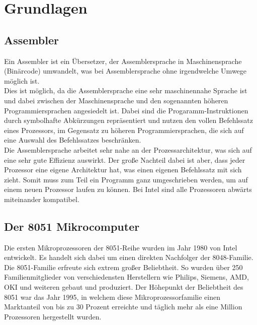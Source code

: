 \chapter{Grundlagen}

\section{Assembler}

Ein Assembler ist ein Übersetzer, der Assemblersprache in Maschinensprache (Binärcode) umwandelt, was bei Assemblersprache
ohne irgendwelche Umwege möglich ist.\\
Dies ist möglich, da die Assemblersprache eine sehr maschinennahe Sprache ist und dabei zwischen der Maschinensprache und den sogenannten höheren
Programmiersprachen angesiedelt ist. Dabei sind die Progaramm-Instruktionen durch symbolhafte Abkürzungen repräsentiert und nutzen den vollen Befehlssatz
eines Prozessors, im Gegensatz zu höheren Programmiersprachen, die sich auf eine Auswahl des Befehlssatzes beschränken.\\
Die Assemblersprache arbeitet sehr nahe an der Prozessarchitektur, was sich auf eine sehr gute Effizienz auswirkt. Der große Nachteil dabei ist aber, 
dass jeder Prozessor eine eigene Architektur hat, was einen eigenen Befehlssatz mit sich zieht. Somit muss zum Teil ein Programm ganz umgeschrieben werden,
um auf einem neuen Prozessor laufen zu können. Bei Intel sind alle Prozessoren abwärts miteinander kompatibel.\\  

\section{Der 8051 Mikrocomputer}

Die ersten Mikroprozessoren der 8051-Reihe wurden im Jahr 1980 von Intel entwickelt. Es handelt sich dabei um einen direkten Nachfolger der 8048-Familie.
Die 8051-Familie erfreute sich extrem großer Beliebtheit. So wurden über 250 Familienmitglieder von verschiedensten Herstellern wie Philips, Siemens, AMD, OKI und weiteren gebaut und produziert. Der Höhepunkt der Beliebtheit des 8051 war das Jahr 1995, in welchem diese Mikroprozessorfamilie einen Marktanteil von bis zu 30 Prozent erreichte und täglich mehr als eine Million Prozessoren hergestellt wurden.

